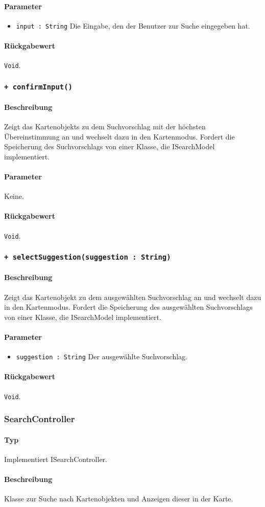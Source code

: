 \paragraph*{Parameter}
\begin{itemize}
    \item \texttt{input : String} Die Eingabe, den der Benutzer zur Suche eingegeben hat.
\end{itemize}
\paragraph*{Rückgabewert}
\texttt{Void}.

\subsubsection*{\texttt{+ confirmInput()}}%
\paragraph*{Beschreibung}
Zeigt das Kartenobjekts zu dem Suchvorschlag mit der höchsten Übereinstimmung an und wechselt dazu in den Kartenmodus.
Fordert die Speicherung des Suchvorschlags von einer Klasse, die ISearchModel implementiert.
\paragraph*{Parameter}
Keine.
\paragraph*{Rückgabewert}
\texttt{Void}.

\subsubsection*{\texttt{+ selectSuggestion(suggestion : String)}}%
\paragraph*{Beschreibung}
Zeigt das Kartenobjekt zu dem ausgewählten Suchvorschlag an und wechselt dazu in den Kartenmodus.
Fordert die Speicherung des ausgewählten Suchvorschlags von einer Klasse, die ISearchModel implementiert.
\paragraph*{Parameter}
\begin{itemize}
    \item \texttt{suggestion : String} Der ausgewählte Suchvorschlag.
\end{itemize}
\paragraph*{Rückgabewert}
\texttt{Void}.


\subsubsection{SearchController}
\paragraph*{Typ}
Implementiert ISearchController.
\paragraph*{Beschreibung}
Klasse zur Suche nach Kartenobjekten und Anzeigen dieser in der Karte.